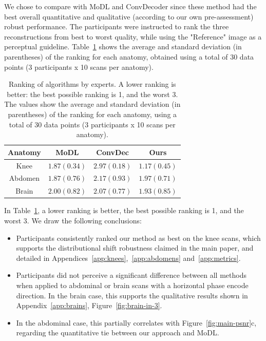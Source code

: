 We chose to compare with MoDL and ConvDecoder since these method had the best overall quantitative and qualitative (according to our own pre-assessment) robust performance. The participants were instructed to rank the three reconstructions from best to worst quality, while using the "Reference" image as a perceptual guideline. Table~\ref{tab:radiologist-scores} shows the average and standard deviation (in parentheses) of the ranking for each anatomy, obtained using a total of 30 data points (3 participants x 10 scans per anatomy).
\begin{table}
    \centering
    \begin{tabular}{|c|c|c|c|}
        \hline
        Anatomy & MoDL & ConvDec & Ours \\
        \hline
        Knee	& $1.87 (0.34)$ & $2.97 (0.18)$	& $1.17 (0.45)$ \\
        Abdomen & $1.87 (0.76)$ & $2.17 (0.93)$ & $1.97 (0.71)$ \\
        Brain	& $2.00 (0.82)$ & $2.07 (0.77)$ & $1.93 (0.85)$ \\
        \hline
    \end{tabular}
    \caption{Ranking of algorithms by experts. A lower ranking is better: the best possible ranking is 1, and the worst 3. The values show the average and standard deviation (in parentheses) of the ranking for each anatomy, using a total of 30 data points (3 participants x 10 scans per anatomy).}
    \label{tab:radiologist-scores}
\end{table}

In Table~\ref{tab:radiologist-scores}, a lower ranking is better, the best possible ranking is 1, and the worst 3. We draw the following conclusions:
\begin{itemize}
    \item Participants consistently ranked our method as best on the knee scans, which supports the distributional shift robustness claimed in the main paper, and detailed in Appendices~\ref{app:knees},~\ref{app:abdomens} and~\ref{app:metrics}.
    \item Participants did not perceive a significant difference between all methods when applied to abdominal or brain scans with a horizontal phase encode direction. In the brain case, this supports the qualitative results shown in Appendix~\ref{app:brains}, Figure~\ref{fig:brain-in-3}.
    \item In the abdominal case, this partially correlates with Figure~\ref{fig:main-psnr}c, regarding the quantitative tie between our approach and MoDL.
\end{itemize}

